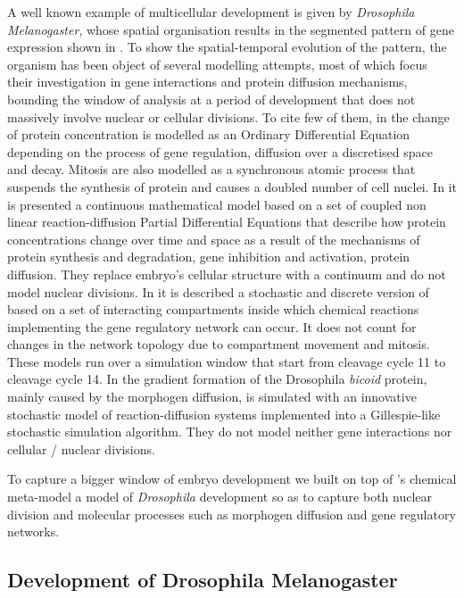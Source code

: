 \documentclass[12pt,a4paper,twoside,openright]{book}
\begin{document}
A well known example of multicellular development is given by \emph{Drosophila Melanogaster}, whose spatial organisation results in the segmented pattern of gene expression shown in  . 
%
To show the spatial-temporal evolution of the pattern, the organism has been object of several modelling attempts, most of which focus their investigation in gene interactions and protein diffusion mechanisms, bounding the window of analysis at a period of development that does not massively involve nuclear or cellular divisions. 
%
To cite few of them, in \cite{reinitz95} the change of protein concentration is modelled as an Ordinary Differential Equation depending on the process of gene regulation, diffusion over a  discretised space and decay.  Mitosis are also modelled as a synchronous  atomic process that suspends the synthesis of protein and causes a doubled number of cell nuclei.
%
In \cite{gursky04} it is presented a continuous mathematical model based on a set of coupled non linear reaction-diffusion Partial Differential Equations  that describe how protein concentrations change over time and space as a result of the mechanisms of protein synthesis and degradation, gene inhibition and activation, protein diffusion. They replace embryo's cellular structure with a continuum and do not model nuclear divisions. 
%
%
In \cite{montagna-cs2bio10} it is described a stochastic and discrete version of  \cite{gursky04} based on a set of interacting compartments inside which chemical reactions implementing the gene regulatory network can occur. It does not count for changes in the network topology due to compartment movement and mitosis.
%
These models run over a simulation window that start from cleavage cycle 11 to cleavage cycle 14.
%
In \cite{LeccaJIB2010} the gradient formation of the Drosophila \emph{bicoid} protein, mainly caused by the morphogen diffusion, is simulated with an innovative stochastic model of reaction-diffusion systems implemented into a Gillespie-like stochastic simulation algorithm. They do not model neither gene interactions nor cellular / nuclear divisions.
%

To capture a bigger window of embryo development we built on top of \alchemist{}'s chemical meta-model a model of \emph{Drosophila} development so as to capture  both nuclear division and molecular processes such as  morphogen diffusion and gene regulatory networks.

\subsection{Development of Drosophila Melanogaster}
\end{document}
